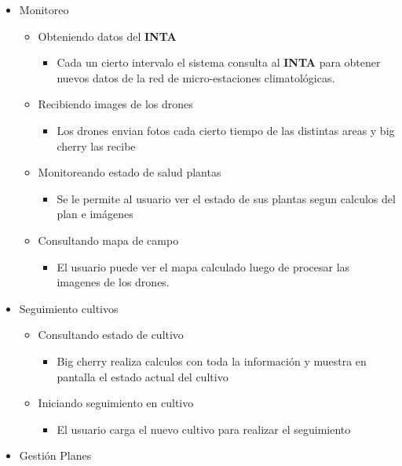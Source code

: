

\begin{itemize}
 \item Monitoreo
 \begin{itemize}
    \item Obteniendo datos del \textbf{INTA}
    \begin{itemize}
      \item Cada un cierto intervalo el sistema consulta al \textbf{INTA} para obtener nuevos datos de  la red de micro-estaciones climatol\'ogicas.
    \end{itemize}
    \item Recibiendo images de los drones
    \begin{itemize}
	\item Los drones envian fotos cada cierto tiempo de las distintas areas y big cherry las recibe
    \end{itemize}
    \item Monitoreando estado de salud plantas
    \begin{itemize}
	\item Se le permite al usuario ver el estado de sus plantas segun calculos del plan e im\'agenes
    \end{itemize}
    \item Consultando mapa de campo
    \begin{itemize}
	\item El usuario puede ver el mapa calculado luego de procesar las imagenes de los drones.
    \end{itemize}
 \end{itemize}
 \item Seguimiento cultivos
 \begin{itemize}
  \item Consultando estado de cultivo
    \begin{itemize}
      \item Big cherry realiza calculos con toda la informaci\'on  y muestra en pantalla el estado actual del cultivo
    \end{itemize}
  \item Iniciando seguimiento en cultivo
  \begin{itemize}
	\item El usuario carga el nuevo cultivo para realizar el seguimiento
    \end{itemize}
  \end{itemize}
 \item Gesti\'on Planes
 \begin{itemize}

\end{itemize}
\end{itemize}
